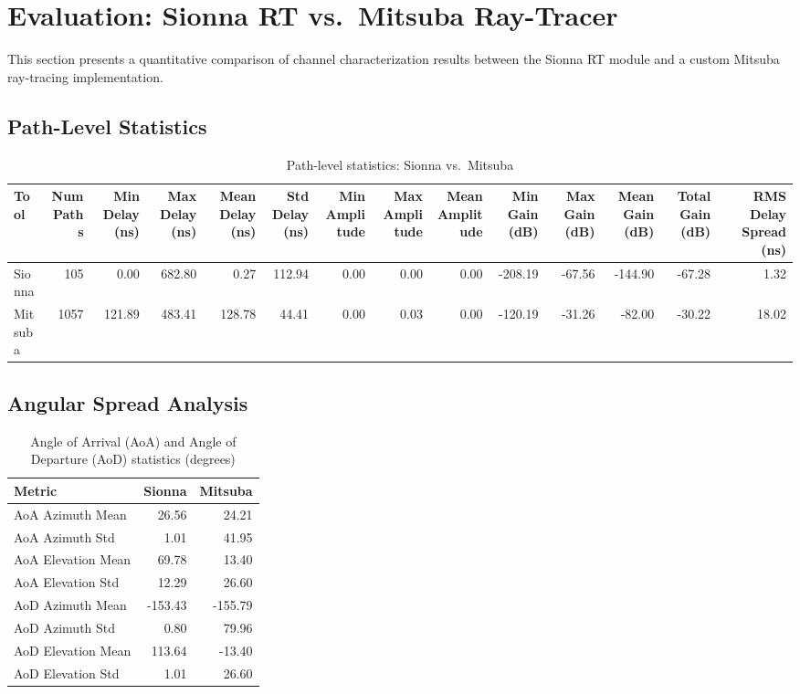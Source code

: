 
\section{Evaluation: Sionna RT vs.\ Mitsuba Ray-Tracer}
\label{sec:evaluation}

This section presents a quantitative comparison of channel characterization results between 
the Sionna RT module and a custom Mitsuba ray-tracing implementation.


\subsection{Path-Level Statistics}

\begin{table}
\caption{Path-level statistics: Sionna vs.\ Mitsuba}
\label{tab:path_stats}
\begin{tabular}{lrrrrrrrrrrrrr}
\toprule
Tool & Num Paths & Min Delay (ns) & Max Delay (ns) & Mean Delay (ns) & Std Delay (ns) & Min Amplitude & Max Amplitude & Mean Amplitude & Min Gain (dB) & Max Gain (dB) & Mean Gain (dB) & Total Gain (dB) & RMS Delay Spread (ns) \\
\midrule
Sionna & 105 & 0.00 & 682.80 & 0.27 & 112.94 & 0.00 & 0.00 & 0.00 & -208.19 & -67.56 & -144.90 & -67.28 & 1.32 \\
Mitsuba & 1057 & 121.89 & 483.41 & 128.78 & 44.41 & 0.00 & 0.03 & 0.00 & -120.19 & -31.26 & -82.00 & -30.22 & 18.02 \\
\bottomrule
\end{tabular}
\end{table}



\subsection{Angular Spread Analysis}

\begin{table}
\caption{Angle of Arrival (AoA) and Angle of Departure (AoD) statistics (degrees)}
\label{tab:angular_stats}
\begin{tabular}{lrr}
\toprule
Metric & Sionna & Mitsuba \\
\midrule
AoA Azimuth Mean & 26.56 & 24.21 \\
AoA Azimuth Std & 1.01 & 41.95 \\
AoA Elevation Mean & 69.78 & 13.40 \\
AoA Elevation Std & 12.29 & 26.60 \\
AoD Azimuth Mean & -153.43 & -155.79 \\
AoD Azimuth Std & 0.80 & 79.96 \\
AoD Elevation Mean & 113.64 & -13.40 \\
AoD Elevation Std & 1.01 & 26.60 \\
\bottomrule
\end{tabular}
\end{table}



